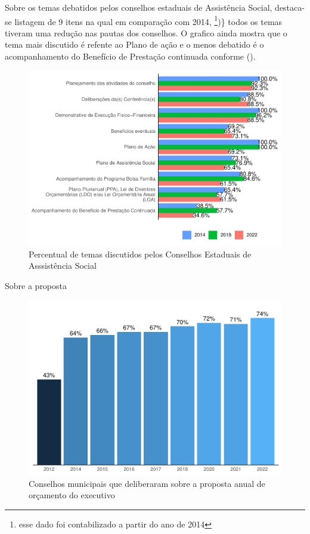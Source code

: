 \documentclass[
  brazilian]{report}
\begin{document}
Sobre os temas debatidos pelos conselhos estaduais de Assistência
Social, destaca-se listagem de 9 itens na qual em comparação com 2014,
\footnote{esse dado foi contabilizado a partir do ano de 2014})\} todos
os temas tiveram uma redução nas pautas dos conselhos. O grafico ainda
mostra que o tema mais discutido é refente ao Plano de ação e o menos
debatido é o acompanhamento do Benefício de Prestação continuada
conforme ().

\begin{figure}
\includegraphics{Censo-SUAS-2022_files/figure-latex/temas_ceas-1} \caption[Percentual de temas discutidos pelos Conselhos Estaduais de Asssistência Social]{Percentual de temas discutidos pelos Conselhos Estaduais de Asssistência Social}\label{fig:temas_ceas}
\end{figure}

Sobre a proposta

\begin{figure}
\includegraphics{Censo-SUAS-2022_files/figure-latex/cmas-ppa-1} \caption[Conselhos municipais que deliberaram sobre a proposta anual de orçamento do executivo]{Conselhos municipais que deliberaram sobre a proposta anual de orçamento do executivo}\label{fig:cmas-ppa}
\end{figure}
\end{document}
